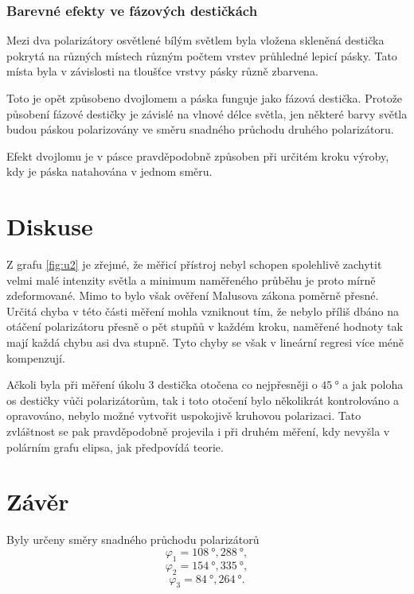 \documentclass{protokol}
\begin{document}
      \subsubsection*{Barevné efekty ve fázových destičkách}

        Mezi dva polarizátory osvětlené bílým světlem byla vložena skleněná destička pokrytá na různých místech různým počtem vrstev průhledné lepicí pásky. Tato místa byla v závislosti na tloušťce vrstvy pásky různě zbarvena.

        Toto je opět způsobeno dvojlomem a páska funguje jako fázová destička. Protože působení fázové destičky je závislé na vlnové délce světla, jen některé barvy světla budou páskou polarizovány ve směru snadného průchodu druhého polarizátoru.

        Efekt dvojlomu je v pásce pravděpodobně způsoben při určitém kroku výroby, kdy je páska natahována v jednom směru.

  \section*{Diskuse}

    Z grafu \ref{fig:u2} je zřejmé, že měřicí přístroj nebyl schopen spolehlivě zachytit velmi malé intenzity světla a minimum naměřeného průběhu je proto mírně zdeformované. Mimo to bylo však ověření Malusova zákona poměrně přesné. Určitá chyba v této části měření mohla vzniknout tím, že nebylo příliš dbáno na otáčení polarizátoru přesně o pět stupňů v každém kroku, naměřené hodnoty tak mají každá chybu asi dva stupně. Tyto chyby se však v lineární regresi více méně kompenzují.

    Ačkoli byla při měření úkolu 3 destička otočena co nejpřesněji o $\SI{45}{\degree}$ a jak poloha os destičky vůči polarizátorům, tak i toto otočení bylo několikrát kontrolováno a opravováno, nebylo možné vytvořit uspokojivě kruhovou polarizaci. Tato zvláštnost se pak pravděpodobně projevila i při druhém měření, kdy nevyšla v polárním grafu elipsa, jak předpovídá teorie.

  \section*{Závěr}
      
    Byly určeny směry snadného průchodu polarizátorů
    $$ \varphi_1 = \SI{108}{\degree}, \SI{288}{\degree}, $$
    $$ \varphi_2 = \SI{154}{\degree}, \SI{335}{\degree}, $$
    $$ \varphi_3 = \SI{84}{\degree}, \SI{264}{\degree}. $$
\end{document}
